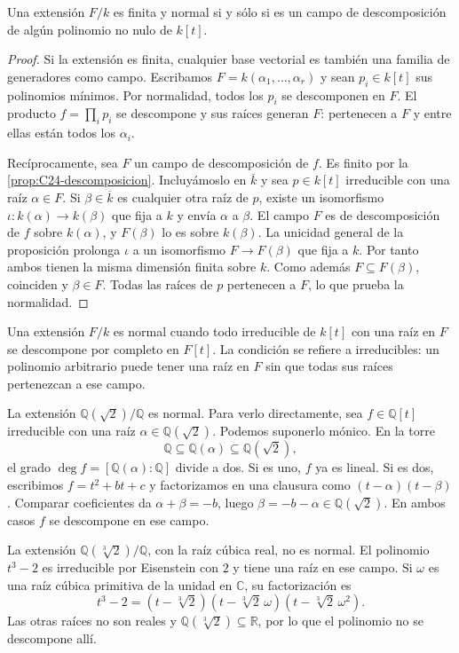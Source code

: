 \begin{teo}\label{teo:C24-normal}
Una extensión $F/k$ es finita y normal si y sólo si es un campo de descomposición de algún polinomio no nulo de $k[t]$.
\end{teo}
\begin{proof}
Si la extensión es finita, cualquier base vectorial es también una familia de generadores como campo. Escribamos $F=k(\alpha_1,\ldots,\alpha_r)$ y sean $p_i\in k[t]$ sus polinomios mínimos. Por normalidad, todos los $p_i$ se descomponen en $F$. El producto $f=\prod_i p_i$ se descompone y sus raíces generan $F$: pertenecen a $F$ y entre ellas están todos los $\alpha_i$.

Recíprocamente, sea $F$ un campo de descomposición de $f$. Es finito por la \cref{prop:C24-descomposicion}. Incluyámoslo en $\overline k$ y sea $p\in k[t]$ irreducible con una raíz $\alpha\in F$. Si $\beta\in\overline k$ es cualquier otra raíz de $p$, existe un isomorfismo $\iota:k(\alpha)\to k(\beta)$ que fija a $k$ y envía $\alpha$ a $\beta$. El campo $F$ es de descomposición de $f$ sobre $k(\alpha)$, y $F(\beta)$ lo es sobre $k(\beta)$. La unicidad general de la proposición prolonga $\iota$ a un isomorfismo $F\to F(\beta)$ que fija a $k$. Por tanto ambos tienen la misma dimensión finita sobre $k$. Como además $F\subseteq F(\beta)$, coinciden y $\beta\in F$. Todas las raíces de $p$ pertenecen a $F$, lo que prueba la normalidad.
\end{proof}

Una extensión $F/k$ es normal cuando todo irreducible de $k[t]$ con una raíz en $F$ se descompone por completo en $F[t]$. La condición se refiere a irreducibles: un polinomio arbitrario puede tener una raíz en $F$ sin que todas sus raíces pertenezcan a ese campo.

\begin{ejem}
La extensión $\mathbb Q(\sqrt2)/\mathbb Q$ es normal. Para verlo directamente, sea $f\in\mathbb Q[t]$ irreducible con una raíz $\alpha\in\mathbb Q(\sqrt2)$. Podemos suponerlo mónico. En la torre
\[
\mathbb Q\subseteq\mathbb Q(\alpha)\subseteq\mathbb Q(\sqrt2),
\]
el grado $\deg f=[\mathbb Q(\alpha):\mathbb Q]$ divide a dos. Si es uno, $f$ ya es lineal. Si es dos, escribimos $f=t^2+bt+c$ y factorizamos en una clausura como $(t-\alpha)(t-\beta)$. Comparar coeficientes da $\alpha+\beta=-b$, luego $\beta=-b-\alpha\in\mathbb Q(\sqrt2)$. En ambos casos $f$ se descompone en ese campo.
\end{ejem}

\begin{ejem}
La extensión $\mathbb Q(\sqrt[3]{2})/\mathbb Q$, con la raíz cúbica real, no es normal. El polinomio $t^3-2$ es irreducible por Eisenstein con $2$ y tiene una raíz en ese campo. Si $\omega$ es una raíz cúbica primitiva de la unidad en $\mathbb C$, su factorización es
\[
t^3-2=(t-\sqrt[3]{2})(t-\sqrt[3]{2}\,\omega)
(t-\sqrt[3]{2}\,\omega^2).
\]
Las otras raíces no son reales y $\mathbb Q(\sqrt[3]{2})\subseteq\mathbb R$, por lo que el polinomio no se descompone allí.
\end{ejem}

